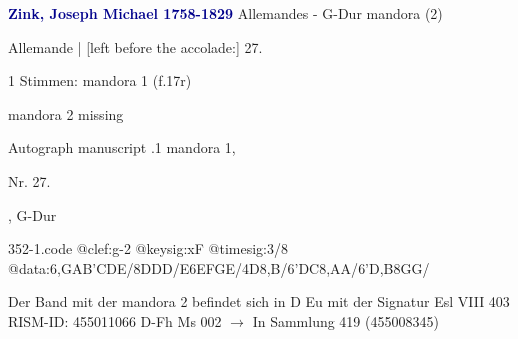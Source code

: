 \documentclass[twocolumn]{book}
\begin{document}
\newline \par \vspace{7pt} \textcolor{darkblue}{\textbf{Zink, Joseph Michael  1758-1829}}
\newline Allemandes - G-Dur
\newline mandora (2)
\newline \begin{itshape}[f.17r, at left:] Allemande | [left before the accolade:] 27.\end{itshape} 
\newline \textcolor{darkblue}{}  1 Stimmen: mandora 1  (f.17r)
\newline \begin{small} mandora 2 missing\end{small} 
\newline Autograph manuscript
.1  mandora 1, \begin{itshape}Nr. 27.\end{itshape}, G-Dur  
\begin{filecontents*}{352-1.code}
@clef:g-2
@keysig:xF
@timesig:3/8
@data:{6,GA}{B'C}DE/8DDD/E{6EF}{GE}/4D8,B/{6'DC}8,AA/{6'D,B}8GG/
\end{filecontents*}
\newline
%
\newline Der Band mit der mandora 2 befindet sich in D Eu mit der Signatur Esl VIII 403
\newline RISM-ID: 455011066
\newline D-Fh  Ms 002
\newline $\rightarrow$ In Sammlung 419 (455008345)
      
\end{document}
